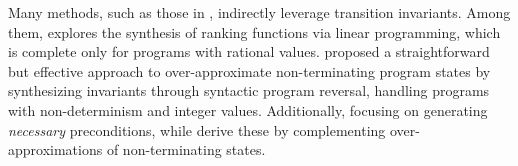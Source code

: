 Many methods, such as those in , indirectly leverage transition invariants. Among them, \textcite{Alias2010} explores the synthesis of ranking functions via linear programming, which is complete only for programs with rational values.  proposed a straightforward but effective approach to over-approximate non-terminating program states by synthesizing invariants through syntactic program reversal, handling programs with non-determinism and integer values. Additionally,  focusing on generating \emph{necessary} preconditions, while  derive these by complementing over-approximations of non-terminating states.


